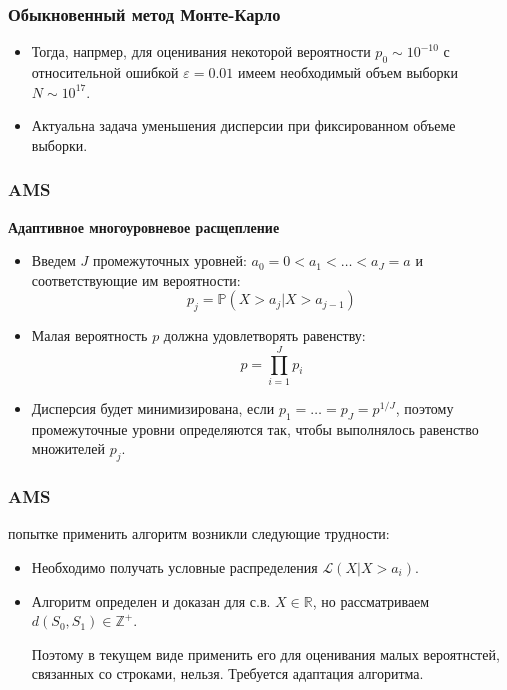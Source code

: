 \documentclass[pdf, 10pt, unicode]{beamer}
\begin{document}
		\begin{frame} \frametitle{Обыкновенный метод Монте-Карло}

		    
		\begin{itemize}
		
		 относительной ошибки $\varepsilon$ получаем требуемый порядок объема выборки:
			\begin{equation*}
				N\sim \frac{1-p}{\varepsilon^2p}
			\end{equation*}
        \item Тогда, напрмер, для оценивания некоторой вероятности $p_0\sim 10^{-10}$ с относительной ошибкой $\varepsilon = 0.01$ имеем необходимый объем выборки $N\sim 10^{17}$.
        
        \item Актуальна задача уменьшения дисперсии при фиксированном объеме выборки. 
        \end{itemize}

	\end{frame}
	\begin{frame}\frametitle{AMS}
		\textbf{{\large Адаптивное многоуровневое расщепление}}~\parencite{Brehier2014}
		\begin{itemize}
			\item Введем $J$ промежуточных уровней: $a_0 = 0 < a_1 < \ldots < a_J = a$ и соответствующие им вероятности: 
			\begin{equation*}
				p_j = \mathbb{P}(X > a_j | X > a_{j-1})
			\end{equation*}
			\item Малая вероятность $p$ должна удовлетворять равенству:
			\begin{equation*}
				p = \prod\limits_{i = 1}^{J}p_i
			\end{equation*}

		\item Дисперсия будет минимизирована, если $p_1 = \ldots = p_J = p^{1/J}$, поэтому промежуточные уровни определяются так, чтобы выполнялось равенство множителей $p_j$. 
		\end{itemize}
	\end{frame}
	
	\begin{frame}\frametitle{AMS}

	     попытке применить алгоритм возникли следующие трудности: 
	    \begin{itemize}
			\item Необходимо получать условные распределения $\mathcal{L}(X|X > a_i)$. 
			\item Алгоритм определен и доказан для с.в. $X \in \mathbb{R}$, но рассматриваем $d(S_0, S_1) \in \mathbb{Z}^{+}$. 
			
			Поэтому в текущем виде применить его для оценивания малых вероятнстей, связанных со строками, нельзя. Требуется адаптация алгоритма. 
		\end{itemize}

	\end{frame}
	


	
\end{document}
